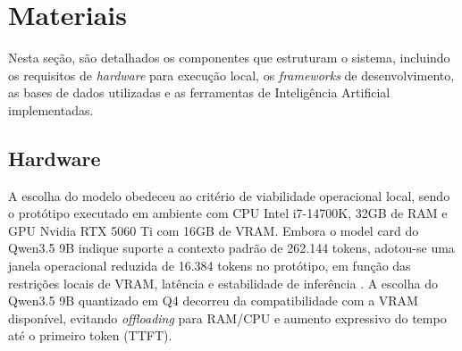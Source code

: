 \documentclass[12pt]{article}
\begin{document}

\section{Materiais}

Nesta seção, são detalhados os componentes que estruturam o sistema, incluindo os requisitos de \textit{hardware} para execução local, os \textit{frameworks} de desenvolvimento, as bases de dados utilizadas e as ferramentas de Inteligência Artificial implementadas.

\subsection{Hardware}
A escolha do modelo obedeceu ao critério de viabilidade operacional local, sendo o protótipo executado em ambiente com CPU Intel i7-14700K, 32GB de RAM e GPU Nvidia RTX 5060 Ti com 16GB de VRAM.
Embora o model card do Qwen3.5 9B indique suporte a contexto padrão de 262.144 tokens, adotou-se uma janela operacional reduzida de 16.384 tokens no protótipo, em função das restrições locais de VRAM, latência e estabilidade de inferência \cite{Qwen35ModelCard2026}.
A escolha do Qwen3.5 9B quantizado em Q4 decorreu da compatibilidade com a VRAM disponível, evitando \textit{offloading} para RAM/CPU e aumento expressivo do tempo até o primeiro token (TTFT).
\end{document}
